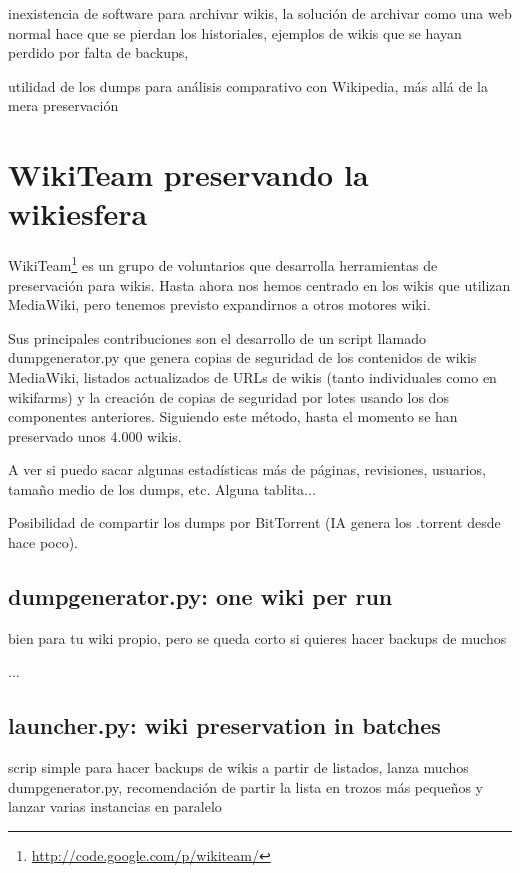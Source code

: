 \documentclass[11pt,twocolumn]{article}
\begin{document}
inexistencia de software para archivar wikis, la solución de archivar como una web normal hace que se pierdan los historiales, ejemplos de wikis que se hayan perdido por falta de backups, 

utilidad de los dumps para análisis comparativo con Wikipedia, más allá de la mera preservación

\section{WikiTeam preservando la wikiesfera}

WikiTeam\footnote{\href{http://code.google.com/p/wikiteam/}{http://code.google.com/p/wikiteam/}} es un grupo de voluntarios que desarrolla herramientas de preservación para wikis. Hasta ahora nos hemos centrado en los wikis que utilizan MediaWiki, pero tenemos previsto expandirnos a otros motores wiki.

Sus principales contribuciones son el desarrollo de un script llamado dumpgenerator.py que genera copias de seguridad de los contenidos de wikis MediaWiki, listados actualizados de URLs de wikis (tanto individuales como en wikifarms) y la creación de copias de seguridad por lotes usando los dos componentes anteriores. Siguiendo este método, hasta el momento se han preservado unos 4.000 wikis.

A ver si puedo sacar algunas estadísticas más de páginas, revisiones, usuarios, tamaño medio de los dumps, etc. Alguna tablita...

Posibilidad de compartir los dumps por BitTorrent (IA genera los .torrent desde hace poco).

\subsection{dumpgenerator.py: one wiki per run}

bien para tu wiki propio, pero se queda corto si quieres hacer backups de muchos

...

\subsection{launcher.py: wiki preservation in batches}

scrip simple para hacer backups de wikis a partir de listados, lanza muchos dumpgenerator.py, recomendación de partir la lista en trozos más pequeños y lanzar varias instancias en paralelo
\end{document}
